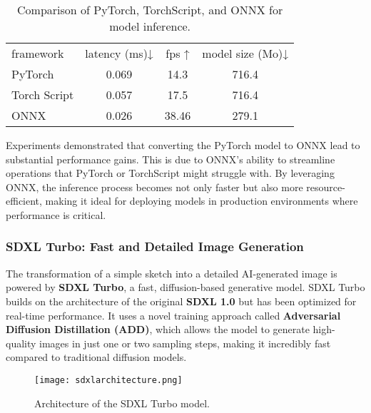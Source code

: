 \begin{table}[h]
    \footnotesize%
    \begin{center}
      \begin{tabular}{lccc}
        \toprule
        framework    & latency (ms)↓ & fps ↑  & model size (Mo)↓ \\
        PyTorch      & 0.069        & 14.3  & 716.4           \\
        Torch Script & 0.057        & 17.5  & 716.4           \\
        ONNX         & 0.026        & 38.46 & 279.1           \\
        \bottomrule
      \end{tabular}
    \end{center}
    \caption{Comparison of PyTorch, TorchScript, and ONNX for model inference.}
    \label{tab:frameworks}
  \end{table}


Experiments demonstrated that converting the PyTorch model to ONNX lead to substantial performance gains.
This is due to ONNX's ability to streamline operations that PyTorch or TorchScript might struggle with.
By leveraging ONNX, the inference process becomes not only faster but also more resource-efficient, making it ideal for deploying models in production environments where performance is critical.

\subsubsection{ SDXL Turbo: Fast and Detailed Image Generation}

The transformation of a simple sketch into a detailed AI-generated image is powered by \textbf{SDXL Turbo}, a fast, diffusion-based generative model.
SDXL Turbo builds on the architecture of the original \textbf{SDXL 1.0} but has been optimized for real-time performance.
It uses a novel training approach called \textbf{Adversarial Diffusion Distillation (ADD)}, which allows the model to generate high-quality images in just one or two sampling steps, making it incredibly fast compared to traditional diffusion models.

\begin{figure}[h]
    \centering
    \texttt{[image: sdxlarchitecture.png]}
    \caption{Architecture of the SDXL Turbo model.}
    \vspace{0.1cm}
    \label{fig:sdxlarchitecture}
\end{figure}

